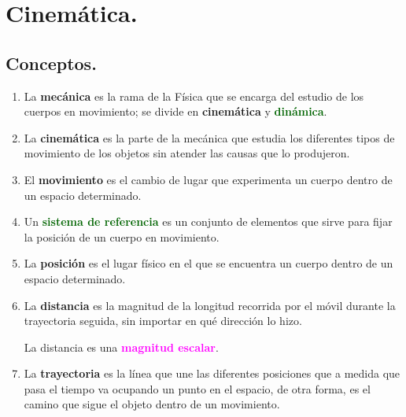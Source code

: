 \documentclass[14pt]{extarticle}
\newcommand{\textocolor}[2]{\textbf{\textcolor{#1}{#2}}}
\begin{document}
\section{Cinemática.}

\subsection{Conceptos.}

\begin{enumerate}
\item La \textocolor{ao}{mecánica} es la rama de la Física que se encarga del estudio de los cuerpos en movimiento; se divide en \textocolor{burgundy}{cinemática} y \textocolor{darkgreen}{dinámica}.
\item La \textocolor{lava}{cinemática} es la parte de la mecánica que estudia los diferentes tipos de movimiento de los objetos sin atender las causas que lo produjeron.
\item El \textocolor{cobalt}{movimiento} es el cambio de lugar que experimenta un cuerpo dentro de un espacio determinado.
\item Un \textocolor{darkgreen}{sistema de referencia} es un conjunto de elementos que sirve para fijar la posición de un cuerpo en movimiento.
\item La \textocolor{byzantine}{posición} es el lugar físico en el que se encuentra un cuerpo dentro de un espacio determinado.
\item La \textocolor{bole}{distancia} es la magnitud de la longitud recorrida por el móvil durante la trayectoria seguida, sin importar en qué dirección lo hizo.

La distancia es una \textocolor{magenta}{magnitud escalar}.
\item La \textocolor{auburn}{trayectoria} es la línea que une las diferentes posiciones que a medida que pasa el tiempo va ocupando un punto en el espacio, de otra forma, es el camino que sigue el objeto dentro de un movimiento.


\end{enumerate}
\end{document}
